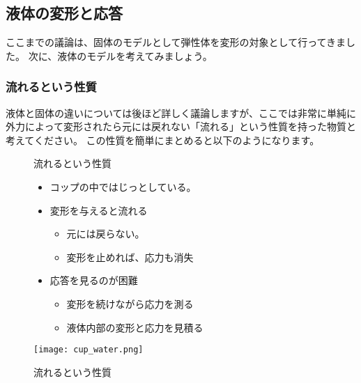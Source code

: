 \documentclass[uplatex,dvipdfmx,a4paper,11pt]{jsarticle}
\begin{document}
\subsection{液体の変形と応答}

ここまでの議論は、固体のモデルとして弾性体を変形の対象として行ってきました。
次に、液体のモデルを考えてみましょう。

\subsubsection{流れるという性質}
液体と固体の違いについては後ほど詳しく議論しますが、ここでは非常に単純に外力によって変形されたら元には戻れない「流れる」という性質を持った物質と考えてください。
この性質を簡単にまとめると以下のようになります。
\begin{figure}[htb]
	\begin{center}
		\begin{minipage}{0.55\textwidth}
			\large
			\begin{itembox}[l]{流れるという性質}
				\begin{itemize}
					\item コップの中ではじっとしている。
					\item 変形を与えると流れる
					\begin{itemize}
						\item 元には戻らない。
						\item 変形を止めれば、応力も消失
					\end{itemize}
					\item 応答を見るのが困難
					\begin{itemize}
						\item 変形を続けながら応力を測る
						\item 液体内部の変形と応力を見積る
					\end{itemize}
				\end{itemize}
			\end{itembox}
		\end{minipage}
		\begin{minipage}{0.35\textwidth}
			\begin{center}
			\texttt{[image: cup\_water.png]}
			\end{center}
		\end{minipage}
		\caption{流れるという性質}
		\label{fig:flow}
	\end{center}
\end{figure}
\end{document}
